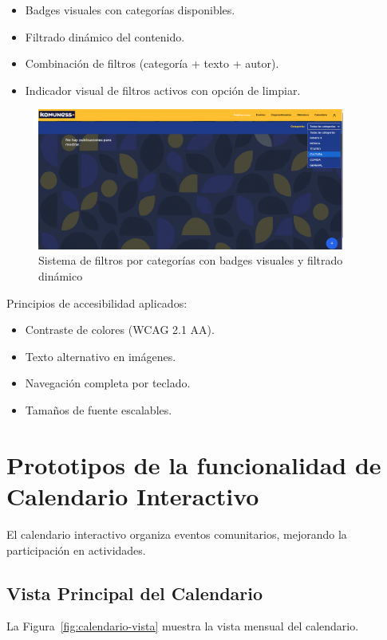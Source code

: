 \begin{itemize}
  \item Badges visuales con categorías disponibles.
  \item Filtrado dinámico del contenido.
  \item Combinación de filtros (categoría + texto + autor).
  \item Indicador visual de filtros activos con opción de limpiar.
\end{itemize}

\begin{figure}[H]
  \centering
  \includegraphics[width=0.9\textwidth]{project/images/imagen3.png}
  \caption{Sistema de filtros por categorías con badges visuales y filtrado dinámico}
  \label{fig:categorias-filtros}
\end{figure}

Principios de accesibilidad aplicados:
\begin{itemize}
  \item Contraste de colores (WCAG 2.1 AA).
  \item Texto alternativo en imágenes.
  \item Navegación completa por teclado.
  \item Tamaños de fuente escalables.
\end{itemize}

\section{Prototipos de la funcionalidad de Calendario Interactivo}

El calendario interactivo organiza eventos comunitarios, mejorando la participación en actividades.

\subsection{Vista Principal del Calendario}

La Figura~\ref{fig:calendario-vista} muestra la vista mensual del calendario.

